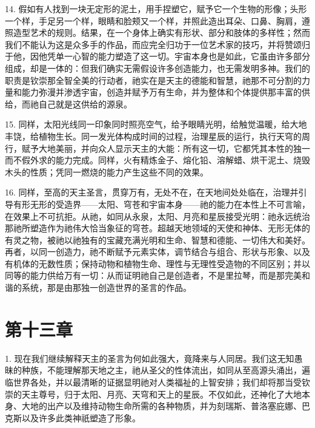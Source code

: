 14. 假如有人找到一块无定形的泥土，用手捏塑它，赋予它一个生物的形像；头形一个样，手足另一个样，眼睛和脸颊又一个样，并照此造出耳朵、口鼻、胸肩，遵照造型艺术的规则。结果，在一个身体上确实有形状、部分和肢体的多样性；然而我们不能认为这是众多手的作品，而应完全归功于一位艺术家的技巧，并将赞颂归于他，因他凭单一心智的能力塑造了这一切。宇宙本身也是如此，它虽由许多部分组成，却是一体的：但我们确实无需假设许多创造能力，也无需发明多神。我们的职责是钦崇那全智全美的行动者，祂实在是天主的德能和智慧，祂那不可分割的力量和能力弥漫并渗透宇宙，创造并赋予万有生命，并为整体和个体提供那丰富的供给，而祂自己就是这供给的源泉。\par

15. 同样，太阳光线同一印象同时照亮空气，给予眼睛光明，给触觉温暖，给大地丰饶，给植物生长。同一发光体构成时间的过程，治理星辰的运行，执行天穹的周行，赋予大地美丽，并向众人显示天主的大能：所有这一切，它都凭其本性的独一而不假外求的能力完成。同样，火有精炼金子、熔化铅、溶解蜡、烘干泥土、烧毁木头的性质；凭同一燃烧的能力产生这些不同的效果。\par

16. 同样，至高的天主圣言，贯穿万有，无处不在，在天地间处处临在，治理并引导有形无形的受造界——太阳、穹苍和宇宙本身——祂的能力在本性上不可言喻，在效果上不可抗拒。从祂，如同从永泉，太阳、月亮和星辰接受光明：祂永远统治那祂所塑造作为祂伟大恰当象征的穹苍。超越天地领域的天使和神体、无形无体的有灵之物，被祂以祂独有的宝藏充满光明和生命、智慧和德能、一切伟大和美好。再者，以同一创造力，祂不断赋予元素实体，调节结合与组合、形状与形象、以及有机体的无数性质；保持动物和植物生命、理性与无理性受造物的不同区别；并以同等的能力供给万有一切：从而证明祂自己是创造者，不是里拉琴，而是那完美和谐的系统，那是由那独一创造世界的圣言的作品。\par


\section{第十三章}

1. 现在我们继续解释天主的圣言为何如此强大，竟降来与人同居。我们这无知愚昧的种族，不能理解那天地之主，祂从圣父的性体流出，如同从至高源头涌出，遍临世界各处，并以最清晰的证据显明祂对人类福祉的上智安排；我们却将那当受钦崇的天主尊号，归于太阳、月亮、天穹和天上的星辰。不仅如此，还神化了大地本身、大地的出产以及维持动物生命所需的各种物质，并为刻瑞斯、普洛塞庇娜、巴克斯以及许多此类神祇塑造了形象。\par

